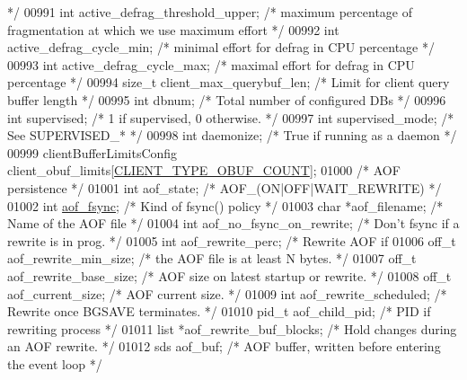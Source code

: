 \begin{DoxyCode}
{{{{{{{       */}
00991     \textcolor{keywordtype}{int} active\_defrag\_threshold\_upper; \textcolor{comment}{/* maximum percentage of fragmentation at which we use maximum
       effort */}
00992     \textcolor{keywordtype}{int} active\_defrag\_cycle\_min;       \textcolor{comment}{/* minimal effort for defrag in CPU percentage */}
00993     \textcolor{keywordtype}{int} active\_defrag\_cycle\_max;       \textcolor{comment}{/* maximal effort for defrag in CPU percentage */}
00994     size\_t client\_max\_querybuf\_len; \textcolor{comment}{/* Limit for client query buffer length */}
00995     \textcolor{keywordtype}{int} dbnum;                      \textcolor{comment}{/* Total number of configured DBs */}
00996     \textcolor{keywordtype}{int} supervised;                 \textcolor{comment}{/* 1 if supervised, 0 otherwise. */}
00997     \textcolor{keywordtype}{int} supervised\_mode;            \textcolor{comment}{/* See SUPERVISED\_* */}
00998     \textcolor{keywordtype}{int} daemonize;                  \textcolor{comment}{/* True if running as a daemon */}
00999     clientBufferLimitsConfig client\_obuf\_limits[\hyperlink{server_8h_aea8f6f3fac3a68e35807eba109dbc501}{CLIENT\_TYPE\_OBUF\_COUNT}];
01000     \textcolor{comment}{/* AOF persistence */}
01001     \textcolor{keywordtype}{int} aof\_state;                  \textcolor{comment}{/* AOF\_(ON|OFF|WAIT\_REWRITE) */}
01002     \textcolor{keywordtype}{int} \hyperlink{config_8h_af5994c643c434574580bb7816af82cad}{aof\_fsync};                  \textcolor{comment}{/* Kind of fsync() policy */}
01003     \textcolor{keywordtype}{char} *aof\_filename;             \textcolor{comment}{/* Name of the AOF file */}
01004     \textcolor{keywordtype}{int} aof\_no\_fsync\_on\_rewrite;    \textcolor{comment}{/* Don't fsync if a rewrite is in prog. */}
01005     \textcolor{keywordtype}{int} aof\_rewrite\_perc;           \textcolor{comment}{/* Rewrite AOF if %
01006     off\_t aof\_rewrite\_min\_size;     \textcolor{comment}{/* the AOF file is at least N bytes. */}
01007     off\_t aof\_rewrite\_base\_size;    \textcolor{comment}{/* AOF size on latest startup or rewrite. */}
01008     off\_t aof\_current\_size;         \textcolor{comment}{/* AOF current size. */}
01009     \textcolor{keywordtype}{int} aof\_rewrite\_scheduled;      \textcolor{comment}{/* Rewrite once BGSAVE terminates. */}
01010     pid\_t aof\_child\_pid;            \textcolor{comment}{/* PID if rewriting process */}
01011     list *aof\_rewrite\_buf\_blocks;   \textcolor{comment}{/* Hold changes during an AOF rewrite. */}
01012     sds aof\_buf;      \textcolor{comment}{/* AOF buffer, written before entering the event loop */}
}}}}}}}
\end{DoxyCode}
